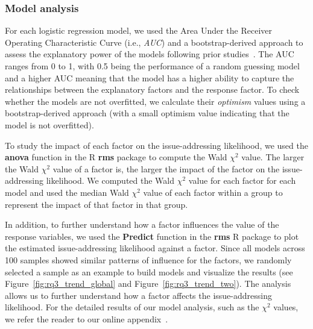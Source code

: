 \subsubsection{Model analysis}
For each logistic regression model, we used the Area Under the Receiver Operating Characteristic Curve (i.e., \textit{AUC}) and a bootstrap-derived approach \cite{efron1986biased} to assess the explanatory power of the models following prior studies~\cite{mcintosh2016empirical,wang2017understanding,kabinna2018examining}. The AUC ranges from 0 to 1, with 0.5 being the performance of a random guessing model and a higher AUC meaning that the model has a higher ability to capture the relationships between the  explanatory factors and the response factor. To check whether the models are not overfitted, we calculate their \textit{optimism} values using a bootstrap-derived approach (with a small optimism value indicating that the model is not overfitted). 

To study the impact of each factor on the issue-addressing likelihood, we used the \textbf{anova} function in the R \textbf{rms} package to compute the Wald $\chi^2$ value.
The larger the Wald $\chi^2$ value of a factor is, the larger the impact of the factor on the issue-addressing likelihood.
We computed the Wald $\chi^2$ value for each factor for each model and used the median Wald $\chi^2$ value of each factor within a group to represent the impact of that factor in that group. %

In addition, to further understand how a factor influences the value of the response variables, we used the \textbf{Predict} function in the \textbf{rms} R package to plot the estimated issue-addressing likelihood against a factor. Since all models across 100 samples showed similar patterns of influence for the factors, we randomly selected a sample as an example to build models and visualize the results (see Figure~\ref{fig:rq3_trend_global} and Figure~\ref{fig:rq3_trend_two}).
The analysis allows us to further understand how a factor affects the issue-addressing likelihood. %
For the detailed results of our model analysis, such as the $\chi^2$ values, we refer the reader to our online appendix~\cite{appendix}.



